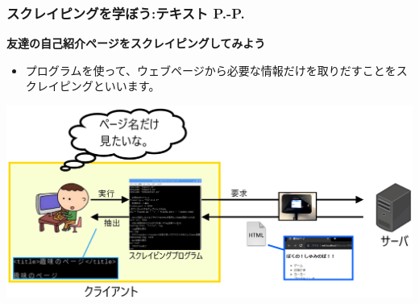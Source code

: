 \documentclass[dvipdfmx]{beamer}
\begin{document}
\begin{frame}[fragile]
	\frametitle{スクレイピングを学ぼう:テキスト P.\pageref{1:P:intro}-P.\pageref{1:P:charCode}~~~}
  \large\textbf{友達の自己紹介ページをスクレイピングしてみよう}
        \begin{itemize}
            \item プログラムを使って、ウェブページから必要な情報だけを取りだすことをスクレイピングといいます。
        \end{itemize}
        \begin{minipage}{\textwidth}
            {\upshape
              \includegraphics[width=\textwidth]{slide08-img003.png}}
        \end{minipage}
\end{frame}
\end{document}
